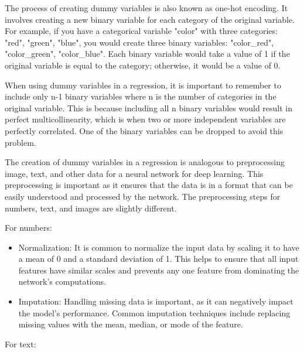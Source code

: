 The process of creating dummy variables is also known as one-hot encoding. It involves creating a new binary variable for each category of the original variable. For example, if you have a categorical variable "color" with three categories: "red", "green", "blue", you would create three binary variables: "color\_red", "color\_green", "color\_blue". Each binary variable would take a value of 1 if the original variable is equal to the category; otherwise, it would be a value of 0.

When using dummy variables in a regression, it is important to remember to include only n-1 binary variables where n is the number of categories in the original variable. This is because including all n binary variables would result in perfect multicollinearity, which is when two or more independent variables are perfectly correlated. One of the binary variables can be dropped to avoid this problem.

The creation of dummy variables in a regression is analogous to preprocessing image, text, and other data for a neural network for deep learning. This preprocessing is important as it ensures that the data is in a format that can be easily understood and processed by the network. The preprocessing steps for numbers, text, and images are slightly different.

For numbers:
\begin{itemize}
	\item Normalization: It is common to normalize the input data by scaling it to have a mean of 0 and a standard deviation of 1. This helps to ensure that all input features have similar scales and prevents any one feature from dominating the network’s computations.
	\item Imputation: Handling missing data is important, as it can negatively impact the model’s performance. Common imputation techniques include replacing missing values with the mean, median, or mode of the feature.
\end{itemize}

For text:

